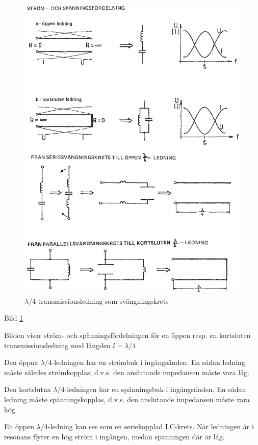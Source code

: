 \begin{figure}
  \includegraphics[width=\textwidth]{images/cropped_pdfs/bild_2_6-35.pdf}
  \caption{$\lambda/4$ transmissionsledning som svängningskrets}
  \label{fig:bildII6-35}
\end{figure}

Bild \ref{fig:bildII6-35}

Bilden visar ström- och spänningsfördelningen för en öppen resp. en
kortsluten transmissionsledning med längden \(l = \lambda/4\).

Den öppna \(\lambda/4\)-ledningen har en strömbuk i ingångsänden. En
sådan ledning måste således strömkopplas, d.v.s. den anslutande
impedansen måste vara låg.

Den kortslutna \(\lambda/4\)-ledningen har en spänningsbuk i
ingångsänden. En sådan ledning måste spänningskopplas, d.v.s. den
anslutande impedansen måste vara hög.

En öppen \(\lambda/4\)-ledning kan ses som en seriekopplad
LC-krets. När ledningen är i resonans flyter en hög ström i ingången,
medan spänningen där är låg.

